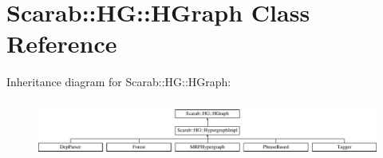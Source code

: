 \hypertarget{class_scarab_1_1_h_g_1_1_h_graph}{
\section{Scarab::HG::HGraph Class Reference}
\label{class_scarab_1_1_h_g_1_1_h_graph}
}
Inheritance diagram for Scarab::HG::HGraph:\begin{figure}[H]
\begin{center}
\leavevmode
\includegraphics[height=1.85635cm]{class_scarab_1_1_h_g_1_1_h_graph}
\end{center}
\end{figure}
